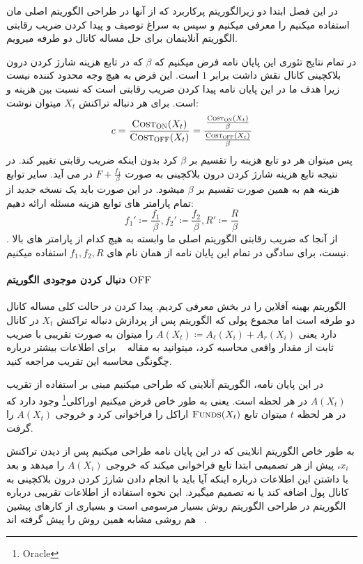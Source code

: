 در این فصل ابتدا دو  زیرالگوریتم پرکاربرد که از آنها در طراحی الگوریتم اصلی مان استفاده میکنیم را معرفی میکنیم و سپس به سراغ توصیف و پیدا کردن ضریب رقابتی الگوریتم آنلاینمان برای حل مساله کانال دو طرفه میرویم.  


در تمام نتایج تئوری این پایان نامه فرض میکنیم که $\beta$ که در تابع هزینه شارژ کردن درون بلاکچینی کانال نقش داشت برابر $1$ است. این فرض به هیچ وجه محدود کننده نیست زیرا هدف ما در این پایان نامه پیدا کردن ضریب رقابتی است که نسبت بین هزینه \on و \off است. برای هر دنباله تراکنش $X_t$ میتوان نوشت:
$$ c  = \frac{\textsc{Cost}_{\textsc{ON}}(X_t)}{\textsc{Cost}_{\textsc{OFF}}(X_t)} =  \frac{\frac{\textsc{Cost}_{\textsc{ON}}(X_t)}{\beta}}{\frac{\textsc{Cost}_{\textsc{OFF}}(X_t)}{{\beta}}}$$
پس میتوان هر دو تابع هزینه را تقسیم بر $\beta$ کرد بدون اینکه ضریب رقابتی تغییر کند. در نتیجه تابع هزینه شارژ کردن درون بلاکچینی به صورت 
$F + \frac{f_1}{\beta}$
در می آید. سایر توابع هزینه هم به همین صورت تقسیم بر $\beta$ میشود. در این صورت باید یک نسخه جدید از تمام پارامتر های توابع هزینه مسئله ارائه دهیم:
$$f_1' \coloneq \frac{f_1}{\beta} , f_2' \coloneq \frac{f_2}{\beta} , R' \coloneq \frac{R}{\beta} $$.
از آنجا که ضریب رقابتی الگوریتم اصلی ما وابسته به هیچ کدام از پارامتر های بالا نیست، برای سادگی در تمام این پایان نامه از همان نام های $f_1,f_2,R$ استفاده میکنیم.


\paragraph{دنبال کردن موجودی الگوریتم $\textsc{OFF}$}
الگوریتم بهینه آفلاین \off
 را در بخش  معرفی کردیم. پیدا کردن \off در حالت کلی مساله کانال دو طرفه  است اما مجموع پولی که الگوریتم \off پس از پردازش دنباله تراکنش $X_t$ در کانال دارد یعنی 
$A(X_t) \coloneq A_{\ell}(X_i) + A_{r}(X_i)$
را میتوان به صورت تقریبی با ضریب ثابت از مقدار واقعی محاسبه کرد، میتوانید به مقاله ~\cite{oracle} برای اطلاعات بیشتر درباره چگونگی محاسبه این تقریب مراجعه کنید.

در این پایان نامه، الگوریتم آنلاینی که طراحی میکنیم مبنی بر استفاده از تقریب $A(X_t) $ در هر لحظه است. یعنی به طور خاص فرض میکنیم اوراکلی\footnote{Oracle} وجود دارد که در هر لحظه $t$ میتوان تابع $\Call{Funds}{X_t}$ 
اراکل را فراخوانی کرد و خروجی  $A(X_t) $ را گرفت.

به طور خاص الگوریتم انلاینی که در این پایان نامه طراحی میکنیم پس از دیدن تراکنش $x_i$، پیش از هر تصمیمی ابتدا تابع
فراخوانی میکند که خروجی  $A(X_i) $ را میدهد و بعد با داشتن این اطلاعات درباره اینکه آیا باید با انجام دادن شارژ کردن درون بلاکچینی به کانال پول اضافه کند یا نه تصمیم میگیرد.
این نحوه استفاده از اطلاعات تقریبی درباره الگوریتم \off در طراحی الگوریتم \on روش بسیار مرسومی است و بسیاری از کارهای پیشین هم روشی مشابه همین روش را پیش گرفته اند 
~\cite{}.
   






